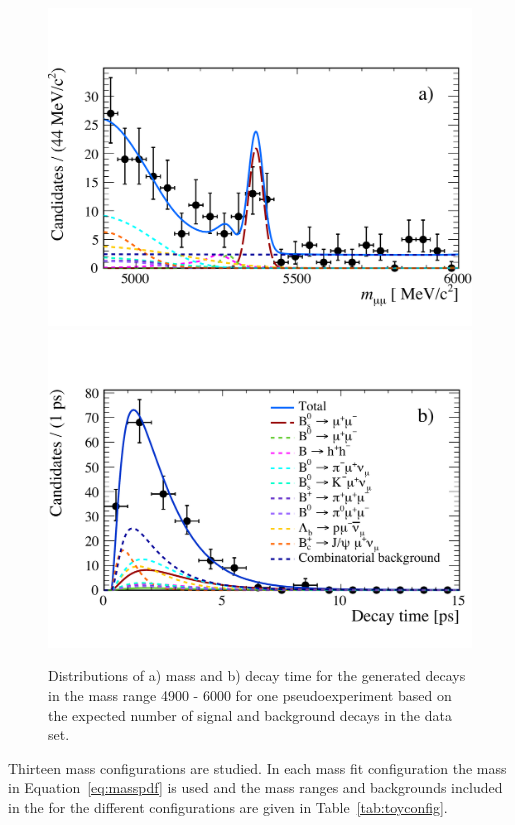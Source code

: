 \begin{figure}[htbp]
    \centering
        \includegraphics[width= 0.8 \textwidth]{./Figs/LifetimeMeasurement/mass_pdf2.pdf}
        \includegraphics[width= 0.8 \textwidth]{./Figs/LifetimeMeasurement/DT_pdf2.pdf}
 
    \caption{Distributions of a) mass and b) decay time for the generated decays in the mass range 4900 - 6000 for one pseudoexperiment based on the expected number of signal and background decays in the data set.}
    \label{fig:toygen}
\end{figure}




Thirteen mass configurations are studied. In each mass fit configuration the mass \pdf in Equation~\ref{eq:masspdf} is used and the mass ranges and backgrounds included in the \pdf for the different configurations are given in Table~\ref{tab:toyconfig}.


